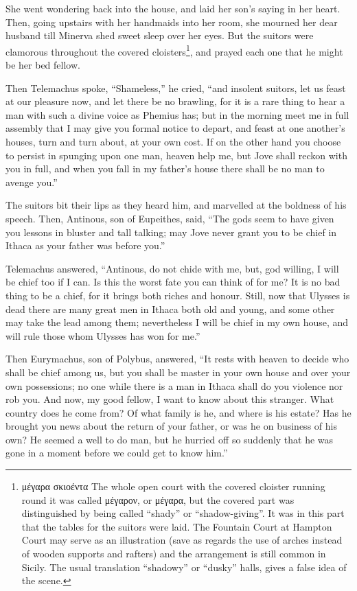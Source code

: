 She went wondering back into the house, and laid her son’s saying in her heart.
Then, going upstairs with her handmaids into her room, she mourned her dear
husband till Minerva shed sweet sleep over her eyes. But the suitors were
clamorous throughout the covered cloisters\footnote{μέγαρα
σκιοέντα The whole open court with
the covered cloister running round it was called
μέγαρον, or
μέγαρα, but the covered part was distinguished
by being called “shady” or “shadow-giving”. It was in this part that the
tables for the suitors were laid. The Fountain Court at Hampton Court may
serve as an illustration (save as regards the use of arches instead of wooden
supports and rafters) and the arrangement is still common in Sicily. The usual
translation “shadowy” or “dusky” halls, gives a false idea of the scene.}, and prayed each one that he might be
her bed fellow.

Then Telemachus spoke, “Shameless,” he cried, “and insolent suitors, let us
feast at our pleasure now, and let there be no brawling, for it is a rare thing
to hear a man with such a divine voice as Phemius has; but in the morning meet
me in full assembly that I may give you formal notice to depart, and feast at
one another’s houses, turn and turn about, at your own cost. If on the other
hand you choose to persist in spunging upon one man, heaven help me, but Jove
shall reckon with you in full, and when you fall in my father’s house there
shall be no man to avenge you.”

The suitors bit their lips as they heard him, and marvelled at the boldness of
his speech. Then, Antinous, son of Eupeithes, said, “The gods seem to have
given you lessons in bluster and tall talking; may Jove never grant you to be
chief in Ithaca as your father was before you.”

Telemachus answered, “Antinous, do not chide with me, but, god willing, I will
be chief too if I can. Is this the worst fate you can think of for me? It is no
bad thing to be a chief, for it brings both riches and honour. Still, now that
Ulysses is dead there are many great men in Ithaca both old and young, and some
other may take the lead among them; nevertheless I will be chief in my own
house, and will rule those whom Ulysses has won for me.”

Then Eurymachus, son of Polybus, answered, “It rests with heaven to decide who
shall be chief among us, but you shall be master in your own house and over
your own possessions; no one while there is a man in Ithaca shall do you
violence nor rob you. And now, my good fellow, I want to know about this
stranger. What country does he come from? Of what family is he, and where is
his estate? Has he brought you news about the return of your father, or was he
on business of his own? He seemed a well to do man, but he hurried off so
suddenly that he was gone in a moment before we could get to know him.”


